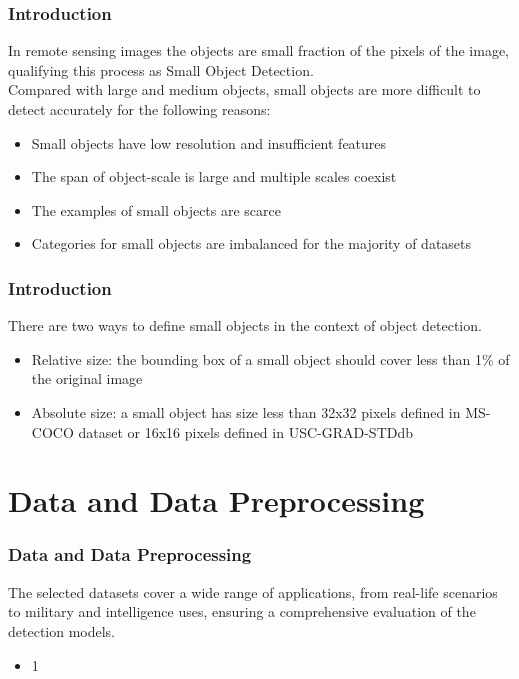 \documentclass{beamer}
\begin{document}
\begin{frame}[t]
  \frametitle{Introduction}
  In remote sensing images the objects are small fraction of the pixels of the image, qualifying this process as Small Object Detection. \\
  \vspace{0.5cm}
  Compared with large and medium objects, small objects are more difficult to detect accurately for the following reasons:
  \begin{itemize}
    \item Small objects have low resolution and insufficient features
    \item The span of object-scale is large and multiple scales coexist
    \item The examples of small objects are scarce
    \item Categories for small objects are imbalanced for the majority of datasets
  \end{itemize}
\end{frame}


\begin{frame}[t]
  \frametitle{Introduction}
  There are two ways to define small objects in the context of object detection.
  \begin{itemize}
    \item Relative size: the bounding box of a small object should cover less than 1\% of the original image
    \item Absolute size: a small object has size less than 32x32 pixels defined in MS-COCO dataset or 16x16 pixels defined in USC-GRAD-STDdb 
  \end{itemize} 

\end{frame}


\section{Data and Data Preprocessing}
\begin{frame}[t]
  \frametitle{Data and Data Preprocessing}
  The selected datasets cover a wide range of applications, from real-life scenarios to military and intelligence uses, ensuring a comprehensive evaluation 
  of the detection models.

  \begin{itemize}
    \item 1 
  \end{itemize}

\end{frame}
\end{document}
